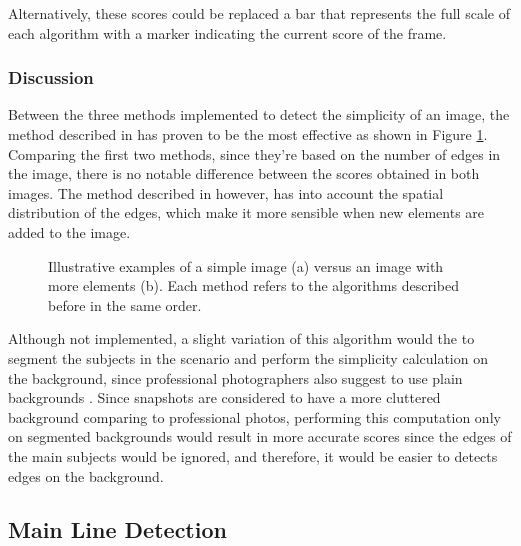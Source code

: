 Alternatively, these scores could be replaced a bar that represents the full scale of each algorithm with a marker indicating the current score of the frame.


\subsubsection{Discussion}

Between the three methods implemented to detect the simplicity of an image, the method described in \cite{ke2006design} has proven to be the most effective as shown in Figure \ref{fig:simp_ex}. Comparing the first two methods, since they're based on the number of edges in the image, there is no notable difference between the scores obtained in both images. The method described in \cite{ke2006design} however, has into account the spatial distribution of the edges, which make it more sensible when new elements are added to the image. 

\begin{figure}[htb]
	\centering
  	\caption{Illustrative examples of a simple image (a) versus an image with more elements (b). Each method refers to the algorithms described before in the same order.}
	\label{fig:simp_ex}
\end{figure}

Although not implemented, a slight variation of this algorithm would the  to segment the subjects in the scenario and perform the simplicity calculation on the background, since professional photographers also suggest to use plain backgrounds \cite{Santos}. Since snapshots are considered to have a more cluttered background comparing to professional photos, performing this computation only on segmented backgrounds would result in more accurate scores since the edges of the main subjects would be ignored, and therefore, it would be easier to detects edges on the background.

\subsection{Main Line Detection}
\label{sub:line_detection}

